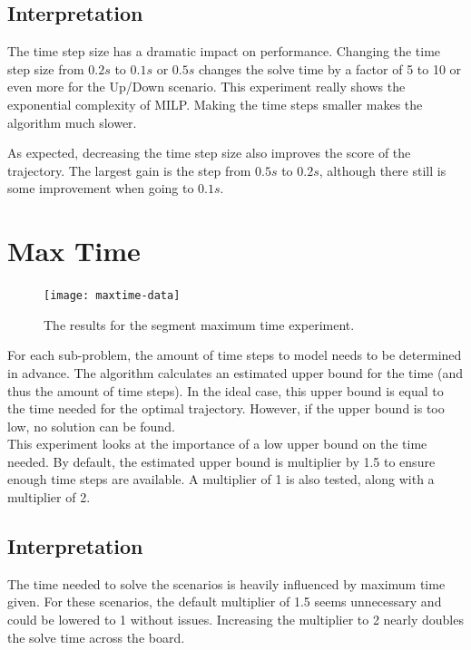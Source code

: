 \subsection{Interpretation}
The time step size has a dramatic impact on performance. Changing the time step size from $0.2s$ to $0.1s$ or $0.5s$ changes the solve time by a factor of 5 to 10 or even more for the Up/Down scenario. This experiment really shows the exponential complexity of MILP. Making the time steps smaller makes the algorithm much slower.
\par
As expected, decreasing the time step size also improves the score of the trajectory. The largest gain is the step from $0.5s$ to $0.2s$, although there still is some improvement when going to $0.1s$.


\section{Max Time}
\label{subsec:maxtime}
\begin{figure}[]
	\centering
	\texttt{[image: maxtime-data]}
	\caption{The results for the segment maximum time experiment.}
	\label{fig:maxtime-data}
\end{figure}
For each sub-problem, the amount of time steps to model needs to be determined in advance. The algorithm calculates an estimated upper bound for the time (and thus the amount of time steps). In the ideal case, this upper bound is equal to the time needed for the optimal trajectory. However, if the upper bound is too low, no solution can be found.\\
This experiment looks at the importance of a low upper bound on the time needed. By default, the estimated upper bound is multiplier by 1.5 to ensure enough time steps are available. A multiplier of 1 is also tested, along with a multiplier of 2. 

\subsection{Interpretation}
The time needed to solve the scenarios is heavily influenced by maximum time given. For these scenarios, the default multiplier of 1.5 seems unnecessary and could be lowered to 1 without issues. Increasing the multiplier to 2 nearly doubles the solve time across the board.


\clearpage
